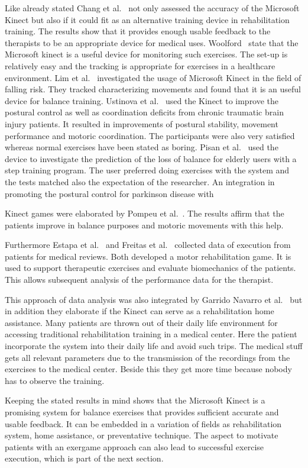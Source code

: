 Like already stated Chang et al.~\cite{Chang2012-hz} not only assessed the accuracy of the Microsoft Kinect but also if it could fit as an alternative training device in rehabilitation training. The results show that it provides enough usable feedback to the therapists to be an appropriate device for medical uses. Woolford~\cite{Woolford2015-ub} state that the Microsoft kinect is a useful device for monitoring such exercises. The set-up is relatively easy and the tracking is appropriate for exercises in a healthcare environment. Lim et al.~\cite{Lim2015-pw} investigated the usage of Microsoft Kinect in the field of falling risk. They tracked characterizing movements and found that it is an useful device for balance training. Ustinova et al.~\cite{Ustinova2014-ml} used the Kinect to improve the postural control as well as coordination deficits from chronic traumatic brain injury patients. It resulted in improvements of postural stability, movement performance and motoric coordination. The participants were also very satisfied whereas normal exercises have been stated as boring. Pisan et al.~\cite{Pisan2013-sf} used the device to investigate the prediction of the loss of balance for elderly users with a step training program. The user preferred doing exercises with the system and the tests matched also the expectation of the researcher. An integration in promoting the postural control for parkinson disease with 

Kinect games were elaborated by Pompeu et al.~\cite{Pompeu2014-yl, Pompeu2015-vp}. The results affirm that the patients improve in balance purposes and motoric movements with this help.

Furthermore Estapa et al.~\cite{Estepa2016-oj} and Freitas et al.~\cite{Freitas2012-ae} collected data of execution from patients for medical reviews. Both developed a motor rehabilitation game. It is used to support therapeutic exercises and evaluate biomechanics of the patients. This allows subsequent analysis of the performance data for the therapist.

This approach of data analysis was also integrated by Garrido Navarro et al.~\cite{Garrido2013-zs} but in addition they elaborate if the Kinect can serve as a rehabilitation home assistance. Many patients are thrown out of their daily life environment for accessing traditional rehabilitation training in a medical center. Here the patient incorporate the system into their daily life and avoid such trips. The medical stuff gets all relevant parameters due to the transmission of the recordings from the exercises to the medical center. Beside this they get more time because nobody has to observe the training.

Keeping the stated results in mind shows that the Microsoft Kinect is a promising system for balance exercises that provides sufficient accurate and usable feedback. It can be embedded in a variation of fields as rehabilitation system, home assistance, or preventative technique. The aspect to motivate patients with an exergame approach can also lead to successful exercise execution, which is part of the next section.